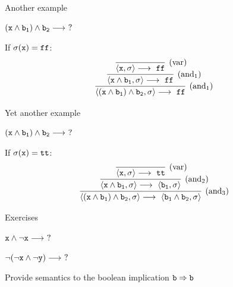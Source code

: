 \documentclass{beamer}
\begin{document}
\begin{frame}{Another example}

        $(\mathtt{x} \wedge \mathtt{b_1}) \wedge \mathtt{b_2} \longrightarrow\ ?$

        \centering
        If $\sigma(\mathtt{x}) = \mathtt{ff}$:
        \[
                \infer[(\text{and$_1$})]{
                        \pv{(\prog{x} \wedge \prog{b_1}) \wedge
                        \prog{b_2}}{\sigma} \longrightarrow\ \prog{ff} 
                }{
                        \infer[(\text{and$_1$})]{
                                \pv{\prog{x} \wedge \prog{b_1}}{\sigma} 
                                \longrightarrow\ \prog{ff}
                        }{
                                \infer[(\text{var})]{ 
                                        \pv{\prog{x}}{\sigma} \longrightarrow\  \prog{ff}
                                }{
                                }
                        }
                }
        \]

\end{frame}

\begin{frame}{Yet another example}

        $(\mathtt{x} \wedge \mathtt{b_1}) \wedge \mathtt{b_2} \longrightarrow\ ?$

        \centering
        If $\sigma(\mathtt{x}) = \mathtt{tt}$:
        \[
                \infer[(\text{and$_3$})]{
                        \pv{(\prog{x} \wedge \prog{b_1}) \wedge
                        \prog{b_2}}{\sigma} \longrightarrow\ 
                        \pv{\prog{b_1} \wedge \prog{b_2}}{\sigma}
                }{
                        \infer[(\text{and$_2$})]{
                                \pv{\prog{x} \wedge \prog{b_1}}{\sigma} 
                                \longrightarrow\ \pv{\prog{b_1}}{\sigma}
                        }{
                                \infer[(\text{var})]{ 
                                        \pv{\prog{x}}{\sigma} \longrightarrow\  \prog{tt}
                                }{
                                }
                        }
                }
        \]

\end{frame}

\begin{frame}{Exercises}

        $\mathtt{x} \wedge \neg \mathtt{x} \longrightarrow\ ?$

        $\neg (\neg \mathtt{x} \wedge \neg \mathtt{y}) \longrightarrow\ ?$

        \bigskip
        Provide semantics to the boolean implication $\mathtt{b} \Rightarrow
        \mathtt{b}$
\end{frame}
\end{document}
